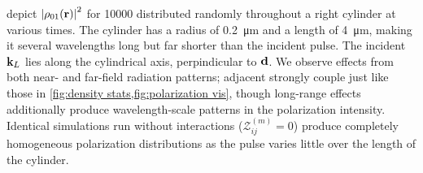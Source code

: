  depict $\abs{\rho_{01}(\vb{r})}^2$ for \num{10000} \qds{} distributed randomly throughout a right cylinder at various times.
The cylinder has a radius of \SI{0.2}{\micro\meter} and a length of \SI{4}{\micro\meter}, making it several wavelengths long but far shorter than the incident pulse.
The incident $\vb{k}_L$ lies along the cylindrical axis, perpindicular to $\vb{d}$.
We observe effects from both near- and far-field radiation patterns; adjacent \qds{} strongly couple just like those in \cref{fig:density stats,fig:polarization vis}, though long-range effects additionally produce wavelength-scale patterns in the polarization intensity.
Identical simulations run without interactions ($\mathcal{Z}^{(m)}_{ij} = 0$) produce completely homogeneous polarization distributions as the pulse varies little over the length of the cylinder.

